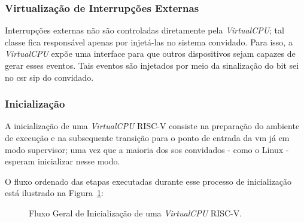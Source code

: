 \subsubsection{Virtualização de Interrupções Externas}

Interrupções externas não são controladas diretamente pela \textit{VirtualCPU}; tal classe fica responsável apenas por
injetá-las no sistema convidado. Para isso, a \textit{VirtualCPU} expõe uma interface para que outros dispositivos sejam
capazes de gerar esses eventos. Tais eventos são injetados por meio da sinalização do bit \gls{sei} no \gls{csr} \gls{sip}
do convidado.

\subsubsection{Inicialização}

A inicialização de uma \textit{VirtualCPU} RISC-V consiste na preparação do ambiente de execução e na subsequente
transição para o ponto de entrada da \gls{vm} já em modo supervisor; uma vez que a maioria dos \glspl{so} convidados -
como o Linux - esperam inicializar nesse modo.

O fluxo ordenado das etapas executadas durante esse processo de inicialização está ilustrado na
Figura~\ref{fig:class-virtual-cpu-boot}:

\vspace{1cm}

\begin{figure}[H]
	\begin{center}
	\end{center}
	\caption{Fluxo Geral de Inicialização de uma \textit{VirtualCPU} RISC-V.}
    \label{fig:class-virtual-cpu-boot}
\end{figure}
